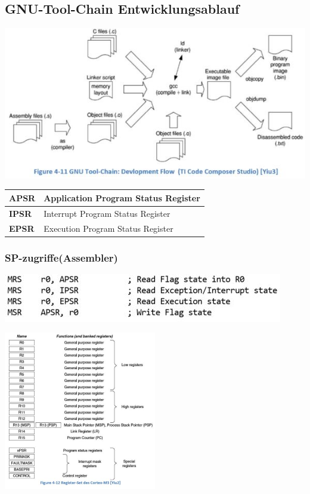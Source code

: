 \subsection{GNU-Tool-Chain Entwicklungsablauf}
\begin{multicols}{2}
    \begin{minipage}{\linewidth}
        \includegraphics[width=\textwidth]{images/gnutoolchain}
        \begin{tabular}{|l|l|}
            \hline 
            \textbf{APSR}& Application Program Status Register \\ 
            \hline 
            \textbf{IPSR}& Interrupt Program Status Register \\ 
            \hline 
            \textbf{EPSR}& Execution Program Status Register \\ 
            \hline 
            \end{tabular}
        \subsubsection{SP-zugriffe(Assembler)}
        \includegraphics[width=\textwidth]{images/SPzugriffe}   
    \end{minipage}
    
    \includegraphics[width=0.5\textwidth]{images/gnutoolchain1}
\end{multicols}

